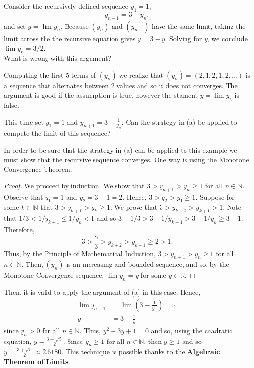 \documentclass[12pt]{article}
\newcommand{\N}{\mathbb{N}}
\newcommand{\R}{\mathbb{R}}
\newenvironment{problem}[2][Problem]{\begin{trivlist} \item[\hskip \labelsep {\bfseries #1}\hskip \labelsep {\bfseries #2.}]}{\end{trivlist}}
\newenvironment{solution}[1][Solution]{\begin{trivlist} \item[\hskip \labelsep {\bfseries #1}]}{\end{trivlist}}
\begin{document}
\begin{problem}{2.4.2}
\begin{enumerate}
  \item Consider the recursively defined sequence $y_{1} = 1$,
\begin{equation*}
  y_{n+1} = 3-y_{n},
\end{equation*}
and set $y=\lim y_{n}$. Because $(y_{n})$ and $(y_{n+})$ have the same limit, taking the limit across the the recursive equation gives $y=3-y$. Solving for $y$, we conclude $\lim y_{n} = 3/2$.\\
What is wrong with this argument?
\begin{solution}
  Computing the first 5 terms of $(y_{n})$ we realize that $(y_{n}) = \left( 2,1,2,1,2,\dots \right)$ is a sequence that alternates between 2 values and so it does not converges. The argument is good if the assumption is true, however the stament $y=\lim y_{n}$ is false.
\end{solution}
\item This time set $y_{1} = 1$ and $y_{n+1} = 3-\frac{1}{y_{n}}$. Can the strategy in (a) be applied to compute the limit of this sequence?
\begin{solution}
  In order to be sure that the strategy in (a) can be applied to this example we must show that the recursive sequence converges. One way is using the Monotone Convergence Theorem.  
\begin{proof}
  We procced by induction. We show that $3>y_{n+1}>y_{n}\geq 1$ for all $n\in \N$. Observe that $y_{1} = 1$ and $y_{2} = 3-1=2$. Hence, $3>y_{2}>y_{1}\geq1$. Suppose for some $k\in \N$ that $3>y_{k+1}>y_{k}\geq1$. We prove that $3>y_{k+2}>y_{k+1}>1$. Note that $1/3 < 1/y_{k+1} \leq 1/y_{k} < 1$ and so $3-1/3 > 3-1/y_{k+1} > 3-1/y_{k} \geq3-1$. Therefore, 
\begin{equation*}
  3>\frac{8}{3} > y_{k+2} > y_{k+1} \geq 2 > 1.
\end{equation*}
Thus, by the Principle of Mathematical Induction, $3>y_{n+1}>y_{n}\geq 1$ for all $n\in \N$. Then, $(y_{n})$ is an increasing and bounded sequence, and so, by the Monotone Convergence sequence, $\lim y_{n} = y$ for some $y\in \R$.
\end{proof}
Then, it is valid to apply the argument of (a) in this case. Hence,
\begin{align*}
  \lim y_{n+1} &= \lim \left( 3-\frac{1}{y_{n}} \right)\implies\\
  y &= 3-\frac{1}{y}
\end{align*}
since $y_{n} > 0$ for all $n\in \N$. Thus, $y^{2}-3y+1=0$ and so, using the cuadratic equation, $y= \frac{3\pm\sqrt{5}}{2}$. Since $y_{n}\geq1$ for all $n\in \N$, then $y\geq1$ and so $y=\frac{3+\sqrt{5}}{2}\approx 2.6180$. This technique is possible thanks to the \textbf{Algebraic Theorem of Limits}.
\end{solution}
\end{enumerate}
\end{problem}
\end{document}
